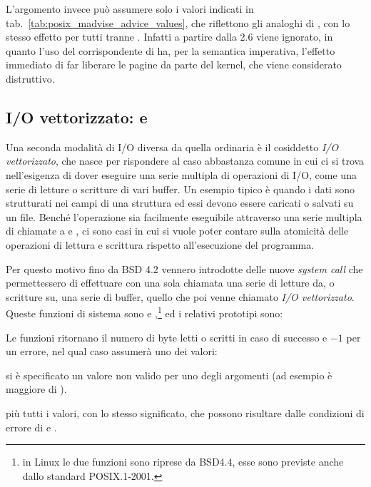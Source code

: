 L'argomento  invece può assumere solo i valori indicati in
tab.~\ref{tab:posix_madvise_advice_values}, che riflettono gli analoghi di
, con lo stesso effetto per tutti tranne
.  Infatti a partire dalla  2.6
 viene ignorato, in quanto l'uso del
corrispondente  di  ha, per la semantica
imperativa, l'effetto immediato di far liberare le pagine da parte del kernel,
che viene considerato distruttivo.



\subsection{I/O vettorizzato:  e }
\label{sec:file_multiple_io}

Una seconda modalità di I/O diversa da quella ordinaria è il cosiddetto
\textsl{I/O vettorizzato}, che nasce per rispondere al caso abbastanza comune
in cui ci si trova nell'esigenza di dover eseguire una serie multipla di
operazioni di I/O, come una serie di letture o scritture di vari buffer. Un
esempio tipico è quando i dati sono strutturati nei campi di una struttura ed
essi devono essere caricati o salvati su un file.  Benché l'operazione sia
facilmente eseguibile attraverso una serie multipla di chiamate a 
e , ci sono casi in cui si vuole poter contare sulla atomicità
delle operazioni di lettura e scrittura rispetto all'esecuzione del programma.

Per questo motivo fino da BSD 4.2 vennero introdotte delle nuove
\textit{system call} che permettessero di effettuare con una sola chiamata una
serie di letture da, o scritture su, una serie di buffer, quello che poi venne
chiamato \textsl{I/O vettorizzato}. Queste funzioni di sistema sono
 e ,\footnote{in Linux le due funzioni sono riprese
  da BSD4.4, esse sono previste anche dallo standard POSIX.1-2001.} ed i
relativi prototipi sono:


\begin{funcproto}{
}

{Le funzioni ritornano il numero di byte letti o scritti in caso di successo e
  $-1$ per un errore, nel qual caso  assumerà uno dei valori:
  \begin{errlist}
    \item[\errcode{EINVAL}] si è specificato un valore non valido per uno degli
    argomenti (ad esempio  è maggiore di ).
  \end{errlist}
  più tutti i valori, con lo stesso significato, che possono risultare
  dalle condizioni di errore di  e .
 }
\end{funcproto}


